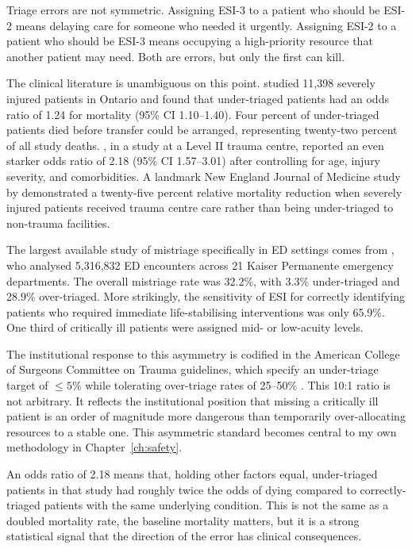 Triage errors are not symmetric. Assigning ESI-3 to a patient who should be ESI-2 means delaying care for someone who needed it urgently. Assigning ESI-2 to a patient who should be ESI-3 means occupying a high-priority resource that another patient may need. Both are errors, but only the first can kill.

The clinical literature is unambiguous on this point. \citet{haas2010survival} studied 11,398 severely injured patients in Ontario and found that under-triaged patients had an odds ratio of 1.24 for mortality (95\% CI 1.10--1.40). Four percent of under-triaged patients died before transfer could be arranged, representing twenty-two percent of all study deaths. \citet{rubano2016undertriage}, in a study at a Level II trauma centre, reported an even starker odds ratio of 2.18 (95\% CI 1.57--3.01) after controlling for age, injury severity, and comorbidities. A landmark New England Journal of Medicine study by \citet{mackenzie2006national} demonstrated a twenty-five percent relative mortality reduction when severely injured patients received trauma centre care rather than being under-triaged to non-trauma facilities.

The largest available study of mistriage specifically in ED settings comes from \citet{sax2023mistriage}, who analysed 5,316,832 ED encounters across 21 Kaiser Permanente emergency departments. The overall mistriage rate was 32.2\%, with 3.3\% under-triaged and 28.9\% over-triaged. More strikingly, the sensitivity of ESI for correctly identifying patients who required immediate life-stabilising interventions was only 65.9\%. One third of critically ill patients were assigned mid- or low-acuity levels.

The institutional response to this asymmetry is codified in the American College of Surgeons Committee on Trauma guidelines, which specify an under-triage target of $\leq 5\%$ while tolerating over-triage rates of 25--50\% \citep{acscot2014resources}. This 10:1 ratio is not arbitrary. It reflects the institutional position that missing a critically ill patient is an order of magnitude more dangerous than temporarily over-allocating resources to a stable one. This asymmetric standard becomes central to my own methodology in Chapter~\ref{ch:safety}.

\begin{notebox}
An odds ratio of 2.18 means that, holding other factors equal, under-triaged patients in that study had roughly twice the odds of dying compared to correctly-triaged patients with the same underlying condition. This is not the same as a doubled mortality rate, the baseline mortality matters, but it is a strong statistical signal that the direction of the error has clinical consequences.
\end{notebox}

